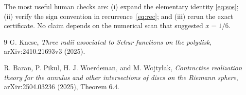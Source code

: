 \documentclass[11pt]{article}
\begin{document}
The most useful human checks are: (i) expand the elementary identity
\eqref{eq:sos}; (ii) verify the sign convention in recurrence~\eqref{eq:rec};
and (iii) rerun the exact certificate.  No claim depends on the numerical scan
that suggested $x=1/6$.

\begin{thebibliography}{9}
G. Knese,
\emph{Three radii associated to Schur functions on the polydisk},
arXiv:2410.21693v3 (2025).

R. Baran, P. Pikul, H. J. Woerdeman, and M. Wojtylak,
\emph{Contractive realization theory for the annulus and other intersections
of discs on the Riemann sphere},
arXiv:2504.03236 (2025), Theorem 6.4.
\end{thebibliography}
\end{document}
